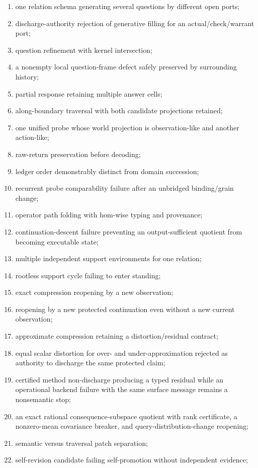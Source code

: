 \documentclass[11pt,oneside]{article}
\begin{document}
\begin{enumerate}
\item one relation schema generating several questions by different open ports;
\item discharge-authority rejection of generative filling for an actual/check/warrant port;
\item question refinement with kernel intersection;
\item a nonempty local question-frame defect safely preserved by surrounding history;
\item partial response retaining multiple answer cells;
\item along-boundary traversal with both candidate projections retained;
\item one unified probe whose world projection is observation-like and another action-like;
\item raw-return preservation before decoding;
\item ledger order demonstrably distinct from domain succession;
\item recurrent probe comparability failure after an unbridged binding/grain change;
\item operator path folding with hom-wise typing and provenance;
\item continuation-descent failure preventing an output-sufficient quotient from becoming executable state;
\item multiple independent support environments for one relation;
\item rootless support cycle failing to enter standing;
\item exact compression reopening by a new observation;
\item reopening by a new protected continuation even without a new current observation;
\item approximate compression retaining a distortion/residual contract;
\item equal scalar distortion for over- and under-approximation rejected as authority
to discharge the same protected claim;
\item certified method non-discharge producing a typed residual while an operational
backend failure with the same surface message remains a nonsemantic stop;
\item an exact rational consequence-subspace quotient with rank certificate, a
nonzero-mean covariance breaker, and query-distribution-change reopening;
\item semantic versus traversal patch separation;
\item self-revision candidate failing self-promotion without independent evidence;

\end{enumerate}
\end{document}
